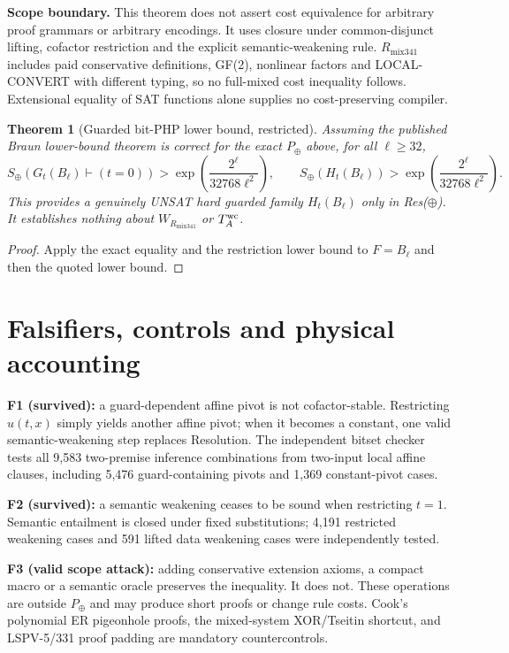 \documentclass[11pt]{article}
\newtheorem{theorem}{Theorem}
\begin{document}
\noindent\textbf{Scope boundary.} This theorem does not assert cost equivalence for arbitrary proof grammars or arbitrary encodings. It uses closure under common-disjunct lifting, cofactor restriction and the explicit semantic-weakening rule. $R_{\mathrm{mix341}}$ includes paid conservative definitions, GF(2), nonlinear factors and LOCAL-CONVERT with different typing, so no full-mixed cost inequality follows. Extensional equality of SAT functions alone supplies no cost-preserving compiler.

\begin{theorem}[Guarded bit-PHP lower bound, restricted]
Assuming the published Braun lower-bound theorem is correct for the exact $P_\oplus$ above, for all $\ell\ge32$,
\[
S_\oplus(G_t(B_\ell)\vdash(t=0)) >
\exp\!\left(\frac{2^\ell}{32768\ell^2}\right),\qquad
S_\oplus(H_t(B_\ell)) >
\exp\!\left(\frac{2^\ell}{32768\ell^2}\right).
\]
This provides a genuinely UNSAT hard guarded family $H_t(B_\ell)$ \emph{only in Res($\oplus$)}. It establishes nothing about $W_{R_{\mathrm{mix341}}}$ or $T_A^{\rm wc}$.
\end{theorem}
\begin{proof}
Apply the exact equality and the restriction lower bound to $F=B_\ell$ and then the quoted lower bound. \end{proof}

\section*{Falsifiers, controls and physical accounting}
\noindent\textbf{F1 (survived):} a guard-dependent affine pivot is not cofactor-stable. Restricting $u(t,x)$ simply yields another affine pivot; when it becomes a constant, one valid semantic-weakening step replaces Resolution. The independent bitset checker tests all 9,583 two-premise inference combinations from two-input local affine clauses, including 5,476 guard-containing pivots and 1,369 constant-pivot cases.

\noindent\textbf{F2 (survived):} a semantic weakening ceases to be sound when restricting $t=1$. Semantic entailment is closed under fixed substitutions; 4,191 restricted weakening cases and 591 lifted data weakening cases were independently tested.

\noindent\textbf{F3 (valid scope attack):} adding conservative extension axioms, a compact macro or a semantic oracle preserves the inequality. It does not. These operations are outside $P_\oplus$ and may produce short proofs or change rule costs. Cook's polynomial ER pigeonhole proofs, the mixed-system XOR/Tseitin shortcut, and LSPV-5/331 proof padding are mandatory countercontrols.
\end{document}
